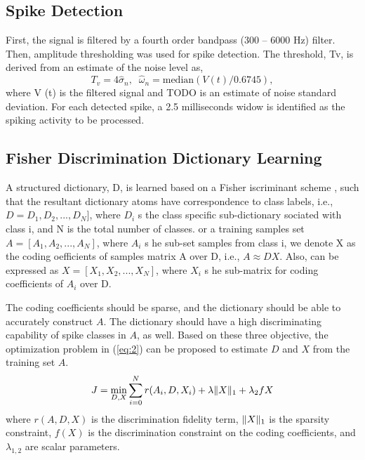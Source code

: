 \documentclass[conference]{IEEEtran}
\begin{document}
	\subsection{Spike Detection}
	First, the signal is filtered by a fourth order bandpass (300 – 6000 Hz) filter. Then, amplitude thresholding was used for spike detection. The threshold, Tv, is derived from an estimate of the noise level \cite{quiroga2004unsupervised} as,
	\begin{equation}
		\label{eq:1}
		T_v=4\hat{\sigma}_n,\;\;\hat{\omega}_n=\mathrm{median}(V(t)/0.6745),
	\end{equation}
	where V (t) is the filtered signal and TODO is an estimate of noise standard deviation. For each detected spike, a 2.5 milliseconds widow is identified as the spiking activity to be processed.
	
	\subsection{Fisher Discrimination Dictionary Learning}
	A structured dictionary, D, is learned based on a Fisher iscriminant scheme \cite{yang2011fisher}, such that the resultant dictionary atoms have correspondence to class labels, i.e., $D = D_1, D_2, ..., D_N]$, where $D_i$ s the class specific sub-dictionary sociated with class i, and N is the total number of classes. or a training samples set $A = [A_1, A_2, ..., A_N]$, where $A_i$ s he sub-set samples from class i, we denote X as the coding oefficients of samples matrix A over D, i.e., $A \approx DX$. Also,  can be expressed as $X = [X_1, X_2, ..., X_N]$, where $X_i$ s he sub-matrix for coding coefficients of $A_i$ over D.
	
	The coding coefficients should be sparse, and the dictionary should be able to accurately construct $A$. The dictionary should have a high discriminating capability of spike classes in $A$, as well. Based on these three objective, the optimization problem in (\ref{eq:2}) can be proposed to estimate $D$ and $X$ from the training set $A$.
	\begin{equation}
		\label{eq:2}
		J=\min_{D,X}\sum_{i=0}^{N}r(A_i,D,X_i)+\lambda\Vert{X}\Vert_1+\lambda_2f{X}
	\end{equation}
	where $r(A, D, X)$ is the discrimination fidelity term, $\Vert{X}\Vert_1$ is the sparsity constraint, $f(X)$ is the discrimination constraint on the coding coefficients, and $\lambda_{1,2}$ are scalar parameters.
	
\end{document}
